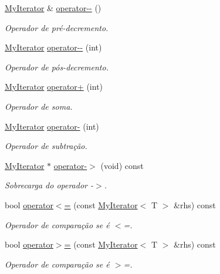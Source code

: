 \begin{DoxyCompactItemize}
\hyperlink{classsc_1_1MyIterator}{My\+Iterator} \& \hyperlink{classsc_1_1MyIterator_a6f96be4dbb7b53cc4e6a39f977a9babb}{operator-\/-\/} ()
\begin{DoxyCompactList}\small\item\em Operador de pré-\/decremento. \end{DoxyCompactList}\item 
\hyperlink{classsc_1_1MyIterator}{My\+Iterator} \hyperlink{classsc_1_1MyIterator_a5b8ef57da66d65e8e95a1ae01cc79252}{operator-\/-\/} (int)
\begin{DoxyCompactList}\small\item\em Operador de pós-\/decremento. \end{DoxyCompactList}\item 
\hyperlink{classsc_1_1MyIterator}{My\+Iterator} \hyperlink{classsc_1_1MyIterator_a493264c7561ef545b06d47c0b5835d59}{operator+} (int)
\begin{DoxyCompactList}\small\item\em Operador de soma. \end{DoxyCompactList}\item 
\hyperlink{classsc_1_1MyIterator}{My\+Iterator} \hyperlink{classsc_1_1MyIterator_a8e2ffa4f2a06d9377238bccb8954b2c0}{operator-\/} (int)
\begin{DoxyCompactList}\small\item\em Operador de subtração. \end{DoxyCompactList}\item 
\hyperlink{classsc_1_1MyIterator}{My\+Iterator} $\ast$ \hyperlink{classsc_1_1MyIterator_a5d82243284e5b50a286e9b45b4566623}{operator-\/$>$} (void) const
\begin{DoxyCompactList}\small\item\em Sobrecarga do operador -\/$>$. \end{DoxyCompactList}\item 
bool \hyperlink{classsc_1_1MyIterator_ad8c2b40a518b2f112784f8fb2fe3e8fe}{operator$<$=} (const \hyperlink{classsc_1_1MyIterator}{My\+Iterator}$<$ T $>$ \&rhs) const
\begin{DoxyCompactList}\small\item\em Operador de comparação se é $<$=. \end{DoxyCompactList}\item 
bool \hyperlink{classsc_1_1MyIterator_ae8dbcb46b7277bc105903ae149670600}{operator$>$=} (const \hyperlink{classsc_1_1MyIterator}{My\+Iterator}$<$ T $>$ \&rhs) const
\begin{DoxyCompactList}\small\item\em Operador de comparação se é $>$=. \end{DoxyCompactList}\item 

\end{DoxyCompactItemize}
